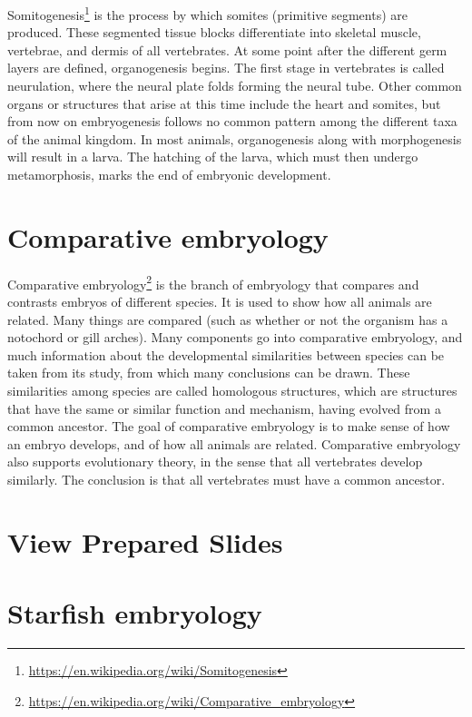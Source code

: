 \documentclass[]{book}
\let\rmarkdownfootnote\footnote%
\def\footnote{\protect\rmarkdownfootnote}
\renewcommand{\href}[2]{#2\footnote{\url{#1}}}
\theoremstyle{definition}
\theoremstyle{definition}
\theoremstyle{definition}
\theoremstyle{remark}
\begin{document}
\href{https://en.wikipedia.org/wiki/Somitogenesis}{Somitogenesis} is the
process by which somites (primitive segments) are produced. These
segmented tissue blocks differentiate into skeletal muscle, vertebrae,
and dermis of all vertebrates. At some point after the different germ
layers are defined, organogenesis begins. The first stage in vertebrates
is called neurulation, where the neural plate folds forming the neural
tube. Other common organs or structures that arise at this time include
the heart and somites, but from now on embryogenesis follows no common
pattern among the different taxa of the animal kingdom. In most animals,
organogenesis along with morphogenesis will result in a larva. The
hatching of the larva, which must then undergo metamorphosis, marks the
end of embryonic development.

\section{Comparative embryology}\label{comparative-embryology}

\href{https://en.wikipedia.org/wiki/Comparative_embryology}{Comparative
embryology} is the branch of embryology that compares and contrasts
embryos of different species. It is used to show how all animals are
related. Many things are compared (such as whether or not the organism
has a notochord or gill arches). Many components go into comparative
embryology, and much information about the developmental similarities
between species can be taken from its study, from which many conclusions
can be drawn. These similarities among species are called homologous
structures, which are structures that have the same or similar function
and mechanism, having evolved from a common ancestor. The goal of
comparative embryology is to make sense of how an embryo develops, and
of how all animals are related. Comparative embryology also supports
evolutionary theory, in the sense that all vertebrates develop
similarly. The conclusion is that all vertebrates must have a common
ancestor.

\section{View Prepared Slides}\label{view-prepared-slides-2}

\section{Starfish embryology}\label{starfish-embryology}
\end{document}
